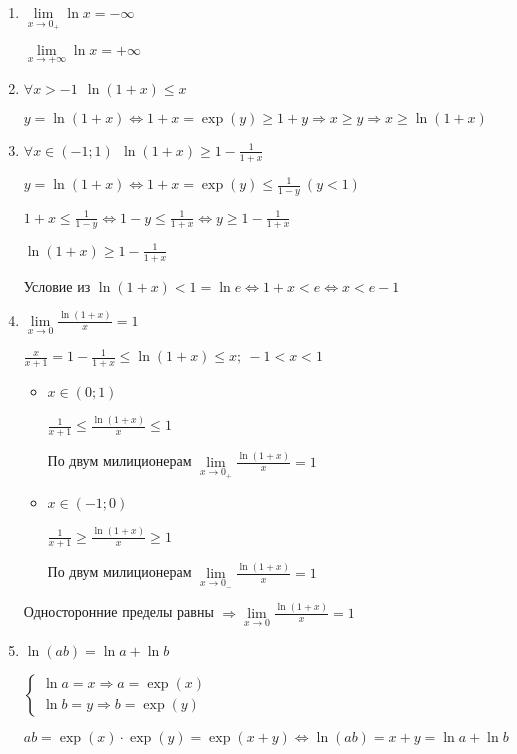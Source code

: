 \documentclass[14pt, letter paper]{article}
\begin{document}
\begin{enumerate}
    \item $\lim\limits_{x \rightarrow 0_+}{\ln{x}} = - \infty$

    $\lim\limits_{x \rightarrow + \infty}{\ln{x}} = + \infty$

    \item $\forall x > -1\ \ \ln{(1+x)} \leq x$

    $y = \ln{(1+x)} \Leftrightarrow 1 + x = \exp(y) \geq 1 + y \Rightarrow x \geq y \Rightarrow x \geq \ln{(1+x)}$

    \item $\forall x \in (-1; 1)\ \ \ln{(1+x)} \geq 1 - \frac{1}{1 + x}$

    $y = \ln{(1+x)} \Leftrightarrow 1 + x = \exp(y) \leq \frac{1}{1-y}\ (y < 1)$

    $1 + x \leq \frac{1}{1 - y} \Leftrightarrow 1 - y \leq \frac{1}{1+x} \Leftrightarrow y \geq 1 - \frac{1}{1+x}$

    $\ln{(1+x)} \geq 1 - \frac{1}{1+x}$

    Условие из $\ln{(1+x)} < 1 = \ln{e} \Leftrightarrow 1 + x < e \Leftrightarrow x < e - 1$

    \item $\lim\limits_{x \rightarrow 0}{\frac{\ln{(1+x)}}{x}} = 1$

    $\frac{x}{x+1} = 1 - \frac{1}{1+x} \leq \ln{(1+x)} \leq x;\ -1 < x < 1$

    \begin{itemize}
        \item $x \in (0; 1)$

        $\frac{1}{x+1} \leq \frac{\ln{(1+x)}}{x} \leq 1$

        По двум милиционерам $\lim\limits_{x \rightarrow 0_+}{\frac{\ln{(1+x)}}{x}} = 1$

        \item $x \in (-1; 0)$

        $\frac{1}{x+1} \geq \frac{\ln{(1+x)}}{x} \geq 1$

        По двум милиционерам $\lim\limits_{x \rightarrow 0_-}{\frac{\ln{(1+x)}}{x}} = 1$
    \end{itemize}

    Односторонние пределы равны $\Rightarrow \lim\limits_{x \rightarrow 0}{\frac{\ln{(1+x)}}{x}} = 1$

    \item $\ln{(ab)} = \ln{a} + \ln{b}$

    $\begin{cases}
        \ln{a} = x \Rightarrow a = \exp(x) \\
        \ln{b} = y \Rightarrow b = \exp(y)
    \end{cases}$

    $ab = \exp(x) \cdot \exp(y) = \exp(x + y) \Leftrightarrow \ln{(ab)} = x + y = \ln{a} + \ln{b}$
\end{enumerate}
\end{document}
